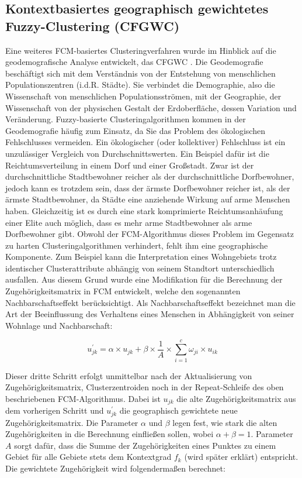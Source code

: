 \documentclass[11pt,ceqn]{book}
\begin{document}
\subsection{Kontextbasiertes geographisch gewichtetes Fuzzy-Clustering (CFGWC)}
Eine weiteres FCM-basiertes Clusteringverfahren wurde im Hinblick auf die geodemografische Analyse entwickelt, das CFGWC \cite{cfgwc}. Die Geodemografie beschäftigt sich mit dem Verständnis von der Entstehung von menschlichen Populationszentren (i.d.R. Städte). Sie verbindet die Demographie, also die Wissenschaft von menschlichen Populationsströmen, mit der Geographie, der Wissenschaft von der physischen Gestalt der Erdoberfläche, dessen Variation und Veränderung. Fuzzy-basierte Clusteringalgorithmen kommen in der Geodemografie häufig zum Einsatz, da Sie das Problem des ökologischen Fehlschlusses vermeiden. Ein ökologischer (oder kollektiver) Fehlschluss ist ein unzulässiger Vergleich von Durchschnittswerten.
Ein Beispiel dafür ist die Reichtumsverteilung in einem Dorf und einer Großstadt. Zwar ist der durchschnittliche Stadtbewohner reicher als der durchschnittliche Dorfbewohner, jedoch kann es trotzdem sein, dass der ärmste Dorfbewohner reicher ist, als der ärmste Stadtbewohner, da Städte eine anziehende Wirkung auf arme Menschen haben. Gleichzeitig ist es durch eine stark komprimierte Reichtumsanhäufung einer Elite auch möglich, dass es mehr arme Stadtbewohner als arme Dorfbewohner gibt.
Obwohl der FCM-Algorithmus dieses Problem im Gegensatz zu harten Clusteringalgorithmen verhindert, fehlt ihm eine geographische Komponente. Zum Beispiel kann die Interpretation eines Wohngebiets trotz identischer Clusterattribute abhängig von seinem Standtort unterschiedlich ausfallen. Aus diesem Grund wurde eine Modifikation für die Berechnung der Zugehörigkeitsmatrix in FCM entwickelt, welche den sogenannten Nachbarschaftseffekt berücksichtigt. Als Nachbarschaftseffekt bezeichnet man die Art der Beeinflussung des Verhaltens eines Menschen in Abhängigkeit von seiner Wohnlage und Nachbarschaft:

$$u_{jk}^{\prime} = \alpha \times u_{jk}+\beta \times \frac{1}{A} \times \sum\limits_{i=1}^c \omega_{ji} \times u _{ik}$$

Dieser dritte Schritt erfolgt unmittelbar nach der Aktualisierung von Zugehörigkeitsmatrix, Clusterzentroiden noch in der Repeat-Schleife des oben beschriebenen FCM-Algorithmus. Dabei ist $u_{jk}$ die alte Zugehörigkeitsmatrix aus dem vorherigen Schritt und $u_{jk}^{\prime}$ die geographisch gewichtete neue Zugehörigkeitsmatrix. Die Parameter $\alpha$ und $\beta$ legen fest, wie stark die alten Zugehörigkeiten in die Berechnung einfließen sollen, wobei $\alpha + \beta = 1$. Parameter $A$ sorgt dafür, dass die Summe der Zugehörigkeiten eines Punktes zu einem Gebiet für alle Gebiete stets dem Kontextgrad $f_k$ (wird später erklärt) entspricht. Die gewichtete Zugehörigkeit wird folgendermaßen berechnet:
\end{document}
